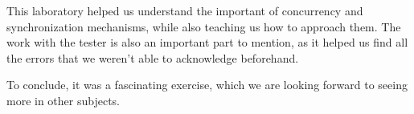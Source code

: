 \documentclass[es]{uc3mreport}
\begin{document}
\begin{report}
      \setcounter{section}{0}

      \setcounter{subsection}{0}

      \setcounter{subsubsection}{0}

      This laboratory helped us understand the important of concurrency
      and synchronization mechanisms, while also teaching us how to
      approach them. The work with the tester is also an important part
      to mention, as it helped us find all the errors that we weren't
      able to acknowledge beforehand.

      To conclude, it was a fascinating exercise, which we are looking
      forward to seeing more in other subjects.

    \end{report}

    
    
\end{document}
